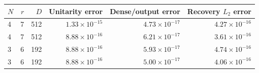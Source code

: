 \begin{center}
{\footnotesize
\setlength{\tabcolsep}{4pt}
\begin{tabular}{@{}lrrrrr@{}}
\toprule
$N$ & $r$ & $D$ & Unitarity error & Dense/output error & Recovery $L_2$ error \\
\midrule
4 & 7 & 512 & $1.33\times10^{-15}$ & $4.73\times10^{-17}$ & $4.27\times10^{-16}$ \\
4 & 7 & 512 & $8.88\times10^{-16}$ & $6.21\times10^{-17}$ & $3.61\times10^{-16}$ \\
3 & 6 & 192 & $8.88\times10^{-16}$ & $5.93\times10^{-17}$ & $4.74\times10^{-16}$ \\
3 & 6 & 192 & $8.88\times10^{-16}$ & $5.00\times10^{-17}$ & $4.06\times10^{-16}$ \\
\bottomrule
\end{tabular}}
\end{center}
